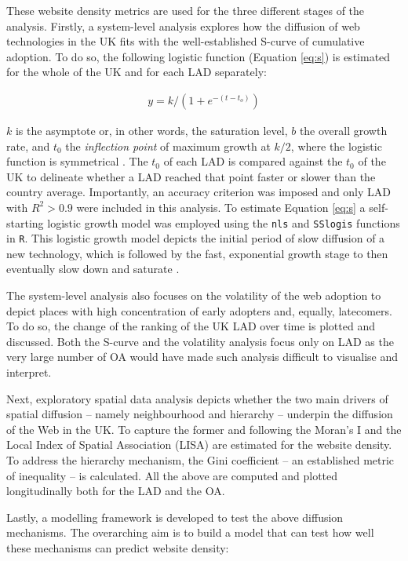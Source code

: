 \documentclass[
  authoryear,
  preprint,
  3p]{elsarticle}
\begin{document}
These website density metrics are used for the three different stages of
the analysis. Firstly, a system-level analysis explores how the
diffusion of web technologies in the UK fits with the well-established
S-curve of cumulative adoption. To do so, the following logistic
function (Equation \ref{eq:s}) is estimated for the whole of the UK and
for each LAD separately:

\begin{align}
y = k /(1 + e^{-(t-t_{o})})\label{eq:s}
\end{align}

\noindent \(k\) is the asymptote or, in other words, the saturation
level, \(b\) the overall growth rate, and \(t_{0}\) the \emph{inflection
point} of maximum growth at \(k/2\), where the logistic function is
symmetrical \citep{wilson201281}. The \(t_0\) of each LAD is compared
against the \(t_0\) of the UK to delineate whether a LAD reached that
point faster or slower than the country average. Importantly, an
accuracy criterion was imposed and only LAD with \(R^2 > 0.9\) were
included in this analysis. To estimate Equation \ref{eq:s} a
self-starting logistic growth model was employed using the \texttt{nls}
and \texttt{SSlogis} functions in \texttt{R}. This logistic growth model
depicts the initial period of slow diffusion of a new technology, which
is followed by the fast, exponential growth stage to then eventually
slow down and saturate \citep{wilson201281, grubler1999dynamics}.

The system-level analysis also focuses on the volatility of the web
adoption to depict places with high concentration of early adopters and,
equally, latecomers. To do so, the change of the ranking of the UK LAD
over time is plotted and discussed. Both the S-curve and the volatility
analysis focus only on LAD as the very large number of OA would have
made such analysis difficult to visualise and interpret.

Next, exploratory spatial data analysis depicts whether the two main
drivers of spatial diffusion -- namely neighbourhood and hierarchy --
underpin the diffusion of the Web in the UK. To capture the former and
following \citet{ding2010modeling} the Moran's I and the Local Index of
Spatial Association (LISA) are estimated for the website density. To
address the hierarchy mechanism, the Gini coefficient -- an established
metric of inequality -- is calculated. All the above are computed and
plotted longitudinally both for the LAD and the OA.

Lastly, a modelling framework is developed to test the above diffusion
mechanisms. The overarching aim is to build a model that can test how
well these mechanisms can predict website density:
\end{document}
